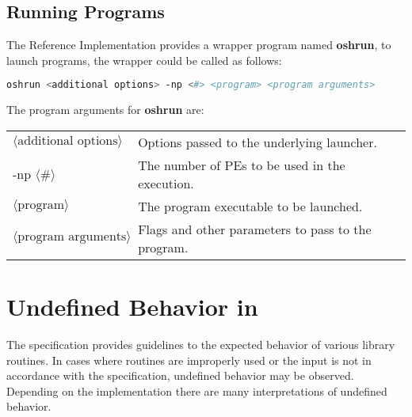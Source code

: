 \section{Running Programs}

The  \openshmem{} Reference Implementation provides a wrapper program named
\textbf{oshrun}, to launch \openshmem programs, the wrapper could be called as
follows:

\begin{lstlisting}[language=bash]
oshrun <additional options> -np <#> <program> <program arguments>
\end{lstlisting}
The program arguments for \textbf{oshrun} are:

\begin{tabular}{p{}p{}}
$\langle\mbox{additional options}\rangle$ & {Options passed to the underlying launcher.}\tabularnewline
-np $\langle\mbox{\#}\rangle$ & {The number of \acp{PE} to be used in the execution.}\tabularnewline
$\langle\mbox{program}\rangle$ & {The program executable to be launched.}\tabularnewline
$\langle\mbox{program arguments}\rangle$ & {Flags and other parameters to pass to the program.}\tabularnewline
\end{tabular}





\chapter{Undefined Behavior in \openshmem}\label{sec:undefined}

The specification provides guidelines to the expected behavior of
various library routines.  In cases where routines are improperly used
or the input is not in accordance with the specification, undefined
behavior may be observed.  Depending on the implementation there are
many interpretations of undefined behavior. 

$\;$

